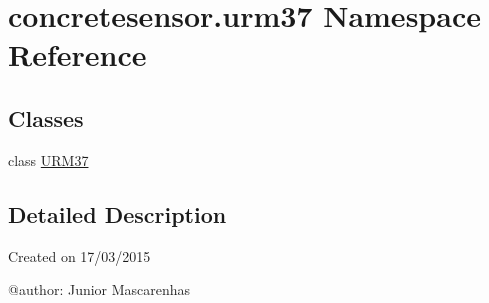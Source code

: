 \hypertarget{namespaceconcretesensor_1_1urm37}{}\section{concretesensor.\+urm37 Namespace Reference}
\label{namespaceconcretesensor_1_1urm37}
\subsection*{Classes}
\begin{DoxyCompactItemize}
\item 
class \hyperlink{classconcretesensor_1_1urm37_1_1URM37}{U\+R\+M37}
\end{DoxyCompactItemize}


\subsection{Detailed Description}
\begin{DoxyVerb}Created on 17/03/2015

@author: Junior Mascarenhas
\end{DoxyVerb}
 